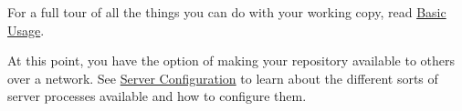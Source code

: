 For a full tour of all the things you can do with your working copy,
read \hyperref[svn.tour]{Basic Usage}.

At this point, you have the option of making your repository available
to others over a network. See \hyperref[svn.serverconfig]{Server
Configuration} to learn about the different sorts of server processes
available and how to configure them.

